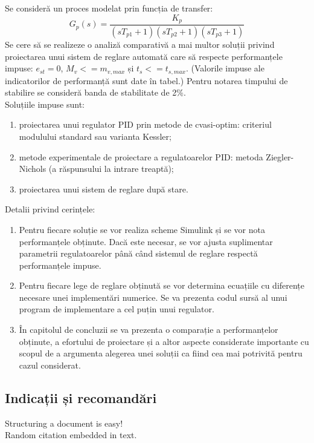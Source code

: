 \documentclass{article}
\begin{document}
Se consideră un proces modelat prin funcția de transfer:
$$G_p(s)=\frac{K_p}{(sT_{p1}+1)(sT_{p2}+1)(sT_{p3}+1)}$$
Se cere să se realizeze o analiză comparativă a mai multor soluții privind proiectarea unui sistem de reglare automată care să respecte performanțele impuse: $e_{st}=0$, $M_v<=m_{v,max}$ și $t_s<=t_{s,max}$. (Valorile impuse ale indicatorilor de performanță sunt date în tabel.) Pentru notarea timpului de stabilire se consideră banda de stabilitate de 2\%. \\
Soluțiile impuse sunt:
\begin{enumerate}[label=\alph*)]
	\item proiectarea unui regulator PID prin metode de cvasi-optim: criteriul modulului standard sau varianta Kessler;
	\item metode experimentale de proiectare a regulatoarelor PID: metoda Ziegler-Nichols (a răspunsului la intrare treaptă);
	\item proiectarea unui sistem de reglare după stare.
\end{enumerate}
Detalii privind cerințele:
\begin{enumerate}[label=\arabic*.]
	\item Pentru fiecare soluție se vor realiza scheme Simulink și se vor nota performanțele obținute. Dacă este necesar, se vor ajusta suplimentar parametrii regulatoarelor până când sistemul de reglare respectă performanțele impuse.
	\item Pentru fiecare lege de reglare obținută se vor determina ecuațiile cu diferențe necesare unei implementări numerice. Se va prezenta codul sursă al unui program de implementare a cel puțin unui regulator.
	\item În capitolul de concluzii se va prezenta o comparație a performanțelor obținute, a efortului de proiectare și a altor aspecte considerate importante cu scopul de a argumenta alegerea unei soluții ca fiind cea mai potrivită pentru cazul considerat.
\end{enumerate}

\subsection{Indicații și recomandări}

Structuring a document is easy!\\
Random citation \cite{DUMMY:1} embedded in text.

\newpage

 

\end{document}
